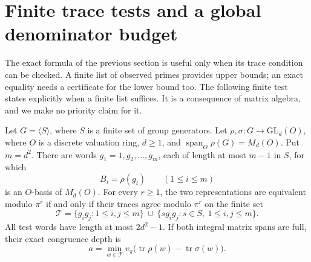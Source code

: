 \section{Finite trace tests and a global denominator budget}
\label{sec:finite}

The exact formula of the previous section is useful only when its trace
condition can be checked. A finite list of observed primes provides upper
bounds; an exact equality needs a certificate for the lower bound too.
The following finite test states explicitly when a finite list suffices.
It is a consequence of matrix algebra, and we make no priority claim for it.

\begin{theorem}
\label{thm:finite}
Let \(G=\langle S\rangle\), where \(S\) is a finite set of group generators.
Let \(\rho,\sigma:G\to\mathrm{GL}_d(O)\), where \(O\) is a discrete valuation
ring, \(d\geq1\), and \(\operatorname{span}_O\rho(G)=M_d(O)\).
Put \(m=d^2\). There are words \(g_1=1,g_2,\ldots,g_m\), each of length
at most \(m-1\) in \(S\), for which
\[
 B_i=\rho(g_i)\qquad(1\leq i\leq m)
\]
is an \(O\)-basis of \(M_d(O)\). For every \(r\geq1\), the two
representations are equivalent modulo \(\pi^r\) if and only if their
traces agree modulo \(\pi^r\) on the finite set
\[
 \mathcal T=\{g_i g_j:1\leq i,j\leq m\}
 \ \cup\
 \{s g_i g_j:s\in S,\ 1\leq i,j\leq m\}.
\]
All test words have length at most \(2d^2-1\).
If both integral matrix spans are full, their exact congruence depth is
\[
 a=\min_{w\in\mathcal T}v_\pi
       \bigl(\operatorname{tr}\rho(w)-\operatorname{tr}\sigma(w)\bigr).
\]
\end{theorem}

